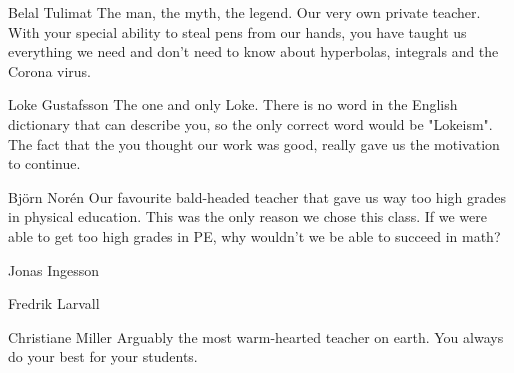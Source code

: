 \documentclass[main.tex]{subfiles}
\begin{document}
Belal Tulimat
The man, the myth, the legend. Our very own private teacher. With your special ability to steal pens from our hands, you have taught us everything we need and don't need to know about hyperbolas, integrals and the Corona virus. 

Loke Gustafsson
The one and only Loke. There is no word in the English dictionary that can describe you, so the only correct word would be "Lokeism". The fact that the you thought our work was good, really gave us the motivation to continue.

Björn Norén
Our favourite bald-headed teacher that gave us way too high grades in physical education. This was the only reason we chose this class. If we were able to get too high grades in PE, why wouldn't we be able to succeed in math?

Jonas Ingesson

Fredrik Larvall

Christiane Miller
Arguably the most warm-hearted teacher on earth. You always do your best for your students. 
\end{document}
